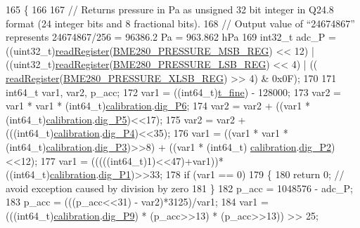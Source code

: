 \begin{DoxyCode}
165 \{
166 
167     \textcolor{comment}{// Returns pressure in Pa as unsigned 32 bit integer in Q24.8 format (24 integer bits and 8 fractional
       bits).}
168     \textcolor{comment}{// Output value of “24674867” represents 24674867/256 = 96386.2 Pa = 963.862 hPa}
169     int32\_t adc\_P = ((uint32\_t)\hyperlink{class_b_m_e280_a1bbd14c8591966df531e40085342ff71}{readRegister}(\hyperlink{_cool_spark_fun_b_m_e280_8h_ac60d376f920e64fe5855852658041c82}{BME280\_PRESSURE\_MSB\_REG}) << 
      12) | ((uint32\_t)\hyperlink{class_b_m_e280_a1bbd14c8591966df531e40085342ff71}{readRegister}(\hyperlink{_cool_spark_fun_b_m_e280_8h_acba4811c6b0815f807732a8c90cb1311}{BME280\_PRESSURE\_LSB\_REG}) << 4) | ((
      \hyperlink{class_b_m_e280_a1bbd14c8591966df531e40085342ff71}{readRegister}(\hyperlink{_cool_spark_fun_b_m_e280_8h_a76fa207f16ead1434519745ce83763e4}{BME280\_PRESSURE\_XLSB\_REG}) >> 4) & 0x0F);
170     
171     int64\_t var1, var2, p\_acc;
172     var1 = ((int64\_t)\hyperlink{class_b_m_e280_ad20f44914b78395f4d4bc64f4a68b369}{t\_fine}) - 128000;
173     var2 = var1 * var1 * (int64\_t)\hyperlink{class_b_m_e280_aa7a28484b6f5eb6f43261ea25016fbf8}{calibration}.\hyperlink{struct_sensor_calibration_ad1a973f775ee6d7f23d9197824971c76}{dig\_P6};
174     var2 = var2 + ((var1 * (int64\_t)\hyperlink{class_b_m_e280_aa7a28484b6f5eb6f43261ea25016fbf8}{calibration}.\hyperlink{struct_sensor_calibration_ae2508256bbfc0e222a677ebbd1d0acf7}{dig\_P5})<<17);
175     var2 = var2 + (((int64\_t)\hyperlink{class_b_m_e280_aa7a28484b6f5eb6f43261ea25016fbf8}{calibration}.\hyperlink{struct_sensor_calibration_a8af2a8c6f19a2a56e784aa9a7bd49cd3}{dig\_P4})<<35);
176     var1 = ((var1 * var1 * (int64\_t)\hyperlink{class_b_m_e280_aa7a28484b6f5eb6f43261ea25016fbf8}{calibration}.\hyperlink{struct_sensor_calibration_ac333ef210929de18815cec04c68acec2}{dig\_P3})>>8) + ((var1 * (int64\_t)
      \hyperlink{class_b_m_e280_aa7a28484b6f5eb6f43261ea25016fbf8}{calibration}.\hyperlink{struct_sensor_calibration_ab8a514b812ec77913dc95147d66bbcc4}{dig\_P2})<<12);
177     var1 = (((((int64\_t)1)<<47)+var1))*((int64\_t)\hyperlink{class_b_m_e280_aa7a28484b6f5eb6f43261ea25016fbf8}{calibration}.\hyperlink{struct_sensor_calibration_aba96e3c2bdbbe79c20a836d9c55c60cf}{dig\_P1})>>33;
178     \textcolor{keywordflow}{if} (var1 == 0)
179     \{
180         \textcolor{keywordflow}{return} 0; \textcolor{comment}{// avoid exception caused by division by zero}
181     \}
182     p\_acc = 1048576 - adc\_P;
183     p\_acc = (((p\_acc<<31) - var2)*3125)/var1;
184     var1 = (((int64\_t)\hyperlink{class_b_m_e280_aa7a28484b6f5eb6f43261ea25016fbf8}{calibration}.\hyperlink{struct_sensor_calibration_a5e942a51a1b5d7753719db1e27e55c06}{dig\_P9}) * (p\_acc>>13) * (p\_acc>>13)) >> 25;

\end{DoxyCode}
